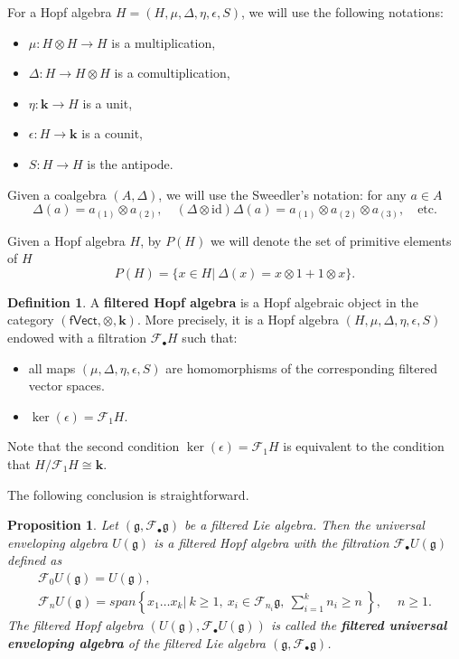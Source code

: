 \documentclass[12pt]{amsart}
\newtheorem{pro}[thm]{Proposition}
\theoremstyle{definition}   %
\newtheorem{defi}[thm]{Definition}
\newcommand{\bk}{{\mathbf{k}}}
\newcommand{\g}{\mathfrak g}
\newcommand{\huaF}{\mathcal{F}}
\newcommand{\fVec}{\mathsf{fVect}}
\begin{document}
For a Hopf algebra $H=(H,\mu, \Delta, \eta, \epsilon, S)$, we  will use the following notations:
    \begin{itemize}
    \item $\mu: H\otimes H \longrightarrow H$ is a multiplication,
     \item $\Delta: H\longrightarrow H\otimes H$ is a comultiplication,
     \item $\eta: \bk\longrightarrow H$ is a unit,
     \item $\epsilon: H\longrightarrow \bk$ is a counit,
     \item $S: H\longrightarrow H$ is the antipode.
\end{itemize}

Given a coalgebra $(A,\Delta)$, we will use the Sweedler's notation: for any $a\in A$
$$
\Delta(a)= a_{(1)}\otimes a_{(2)},
\quad
(\Delta\otimes \mathrm{id})\Delta(a)= a_{(1)}\otimes a_{(2)}\otimes a_{(3)},
\quad \text{etc.}
$$

Given a Hopf algebra $H$, by $P(H)$ we will denote the set of primitive elements of $H$
$$
P(H)=\{x\in H|\ \Delta(x)=x\otimes 1+1\otimes x\}.
$$

\begin{defi}
A {\bf filtered Hopf algebra} is a Hopf algebraic object in the category $(\fVec,\otimes, \bk)$. More precisely, it is a Hopf algebra $(H, \mu, \Delta, \eta, \epsilon, S)$ endowed with a filtration $\huaF_{\bullet}H$  such that:
\begin{itemize}
\item[(i)] all maps $(\mu, \Delta, \eta, \epsilon, S)$ are homomorphisms of the corresponding filtered vector spaces.
\item[(ii)] $\ker(\epsilon)=\huaF_1H$.
\end{itemize}
\end{defi}

Note that the second condition $\ker(\epsilon)=\huaF_1H$ is equivalent to the condition that $H/\huaF_1H\cong\bk$.

The following conclusion is straightforward. %

\begin{pro}\label{pro:Lie-Hopf}\cite{Fr,Quillen}  Let $(\g,\huaF_{\bullet}\g)$ be a filtered Lie algebra. Then the universal enveloping algebra $U(\g)$ is a filtered Hopf algebra with the filtration $\huaF_{\bullet}U(\g)$ defined as
\begin{gather}
\label{g2}\huaF_0U(\g)=U(\g),\\
\label{g3}\huaF_nU(\g)=span \left\{x_1\ldots x_k|\ k\geq 1,\
x_i\in \huaF_{n_i}\g,\ \sum_{i=1}^k n_i\ge n\ \right\},\quad\ n\geq 1.
\end{gather}
The filtered Hopf algebra $(U(\g),\huaF_{\bullet}U(\g))$  is called  the {\bf filtered universal enveloping algebra} of the filtered Lie algebra $(\g,\huaF_{\bullet}\g)$.
\end{pro}
\end{document}
